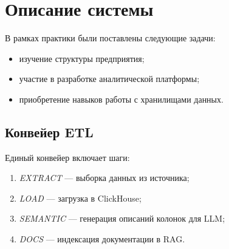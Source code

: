 \section{Описание системы}

В рамках практики были поставлены следующие задачи:
\begin{itemize}
    \item изучение структуры предприятия;
    \item участие в разработке аналитической платформы;
    \item приобретение навыков работы с хранилищами данных.
\end{itemize}

\subsection{Конвейер ETL}

Единый конвейер включает шаги:
\begin{enumerate}
    \item \textit{EXTRACT} --- выборка данных из источника;
    \item \textit{LOAD} --- загрузка в ClickHouse;
    \item \textit{SEMANTIC} --- генерация описаний колонок для LLM;
    \item \textit{DOCS} --- индексация документации в RAG.
\end{enumerate}
